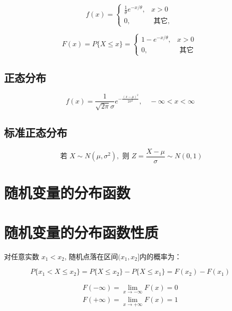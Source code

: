 \begin{equation}
f(x)=\left\{\begin{array}{ll}
\frac{1}{\theta} e^{-x / \theta}, & x>0 \\
0, & \text { 其它, }
\end{array}\right.
\end{equation}

\begin{equation}
F(x)=P\{X \leq x\}=\left\{\begin{array}{ll}
1-e^{-x / \theta}, & x>0 \\
0, & \text { 其它 }
\end{array}\right.
\end{equation}

\subsection{正态分布}

\begin{equation}
f(x)=\frac{1}{\sqrt{2 \pi} \sigma} e^{-\frac{(x-\mu)^{2}}{2 \sigma^{2}}}, \quad-\infty<x<\infty
\end{equation}

\subsection{标准正态分布}

\begin{equation}
\text { 若 } X \sim N\left(\mu, \sigma^{2}\right), \text { 则 } Z=\frac{X-\mu}{\sigma} \sim N({0}, 1)
\end{equation}

\section{随机变量的分布函数}

\section{随机变量的分布函数性质}

对任意实数 $x_1<x_2$, 随机点落在区间$( x_1 ,  x_2 ]$内的概率为：

\begin{equation}
P\{ x_1<X  \le  x_2\} =P\{ X  \le   x_2 \} - P\{ X  \le   x_1 \}= F(x_2)-F(x_1)
\end{equation}

\begin{equation}
\begin{array}{l}
F(-\infty)=\lim_{x \rightarrow-\infty} F(x)=0 \\
F(+\infty)=\lim_{x \rightarrow+\infty} F(x)=1
\end{array}
\end{equation}

